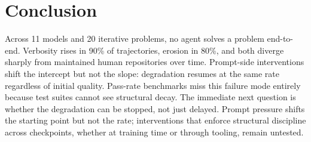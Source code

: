 \section{Conclusion}
\label{sec:conclusion}

Across 11 models and 20 iterative problems, no agent solves a problem end-to-end. Verbosity rises in 90\% of trajectories, erosion in 80\%, and both diverge sharply from maintained human repositories over time. Prompt-side interventions shift the intercept but not the slope: degradation resumes at the same rate regardless of initial quality. Pass-rate benchmarks miss this failure mode entirely because test suites cannot see structural decay. The immediate next question is whether the degradation can be stopped, not just delayed. Prompt pressure shifts the starting point but not the rate; interventions that enforce structural discipline across checkpoints, whether at training time or through tooling, remain untested.


